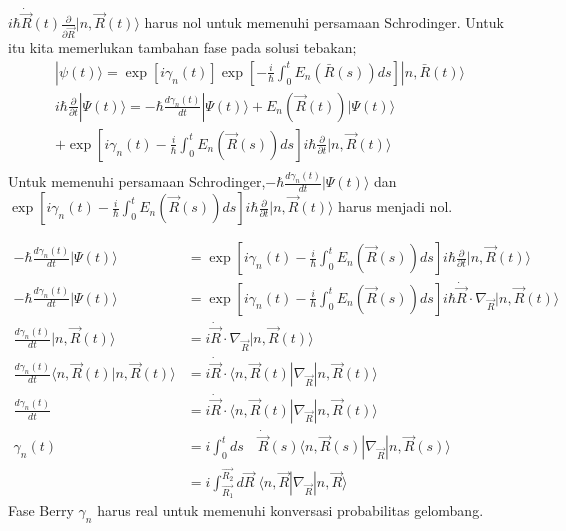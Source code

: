 $ i\hbar \dot{\vec{R}}(t) \frac{\partial}{\partial \vec{R}} |n, \vec{R}(t) \rangle $ harus nol untuk memenuhi persamaan Schrodinger. Untuk itu kita memerlukan tambahan fase pada solusi tebakan;
\begin{align}
  |\psi(t)\rangle = \exp[i\gamma_n(t)] \exp \left[ -\frac{i}{\hbar} \int_0^t E_n (\bar{R}(s))ds \right] |n, \bar{R}(t) \rangle  \\ 
i\hbar \frac{\partial}{\partial t} |\Psi(t) \rangle = -\hbar \frac{d\gamma_n(t)}{dt} |\Psi(t) \rangle + E_n \left( \vec{R}(t) \right) |\Psi(t) \rangle \\
+ \exp \left[ i\gamma_n(t) - \frac{i}{\hbar} \int_{0}^{t} E_n (\vec{R}(s)) ds \right] i\hbar \frac{\partial}{\partial t} |n, \vec{R}(t) \rangle \\ 
\end{align}  
Untuk memenuhi persamaan Schrodinger,$ -\hbar \frac{d\gamma_n(t)}{dt} |\Psi(t) \rangle$ dan $ \exp \left[ i\gamma_n(t) - \frac{i}{\hbar} \int_{0}^{t} E_n (\vec{R}(s)) ds \right] i\hbar \frac{\partial}{\partial t} |n, \vec{R}(t) \rangle $ harus menjadi nol.


\begin{align}
    -\hbar \frac{d\gamma_n(t)}{dt} |\Psi(t) \rangle &= \exp \left[ i\gamma_n(t) - \frac{i}{\hbar} \int_{0}^{t} E_n (\vec{R}(s)) ds \right] i\hbar \frac{\partial}{\partial t} |n, \vec{R}(t) \rangle \\ 
    -\hbar \frac{d\gamma_n(t)}{dt} |\Psi(t) \rangle &= \exp \left[ i\gamma_n(t) - \frac{i}{\hbar} \int_{0}^{t} E_n (\vec{R}(s)) ds \right] i\hbar \dot{\vec{R}} \cdot \nabla_{\vec{R}} |n, \vec{R}(t) \rangle \\ 
    \frac{d\gamma_n(t)}{dt} |n, \vec{R}(t) \rangle &= i \dot{\vec{R}} \cdot \nabla_{\vec{R}} |n, \vec{R}(t) \rangle \\ 
    \frac{d\gamma_n(t)}{dt} \langle n, \vec{R}(t)|n, \vec{R}(t) \rangle &= i \dot{\vec{R}} \cdot \langle n, \vec{R}(t)| \nabla_{\vec{R}} |n, \vec{R}(t) \rangle \\
    \frac{d\gamma_n(t)}{dt} &= i \dot{\vec{R}} \cdot \langle n, \vec{R}(t)| \nabla_{\vec{R}} |n, \vec{R}(t) \rangle \\ 
    \gamma_n(t) &= i \int_0^t ds \quad \dot{\vec{R}}(s)\langle n, \vec{R}(s)| \nabla_{\vec{R}} |n, \vec{R}(s) \rangle \\ 
                &= i \int_{\vec{R_1}}^{\vec{R_2}} d\vec{R} \; \langle n, \vec{R}| \nabla_{\vec{R}} |n, \vec{R} \rangle
  \end{align}
Fase Berry $\gamma_n$ harus real untuk memenuhi konversasi probabilitas gelombang.

